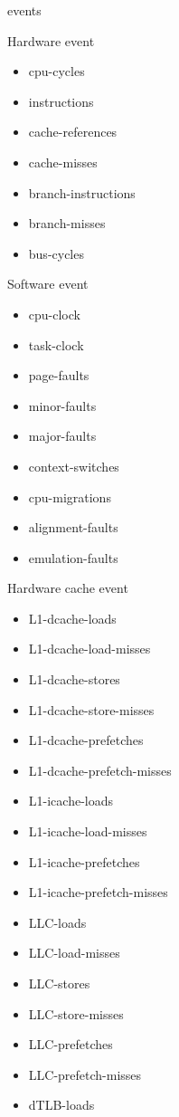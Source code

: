 \begin{frame}{events}
\begin{tiny}
\begin{multicols}{3}
Hardware event
\begin{itemize}
  \item cpu-cycles
  \item instructions
  \item cache-references
  \item cache-misses
  \item branch-instructions
  \item branch-misses
  \item bus-cycles
\end{itemize}
Software event
\begin{itemize}
  \item cpu-clock
  \item task-clock
  \item page-faults
  \item minor-faults
  \item major-faults
  \item context-switches
  \item cpu-migrations
  \item alignment-faults
  \item emulation-faults
\end{itemize}
Hardware cache event
\begin{itemize}
  \item L1-dcache-loads
  \item L1-dcache-load-misses
  \item L1-dcache-stores
  \item L1-dcache-store-misses
  \item L1-dcache-prefetches
  \item L1-dcache-prefetch-misses
  \item L1-icache-loads
  \item L1-icache-load-misses
  \item L1-icache-prefetches
  \item L1-icache-prefetch-misses
  \item LLC-loads
  \item LLC-load-misses
  \item LLC-stores
  \item LLC-store-misses
  \item LLC-prefetches
  \item LLC-prefetch-misses
  \item dTLB-loads

\end{itemize}
\end{multicols}
\end{tiny}
\end{frame}
